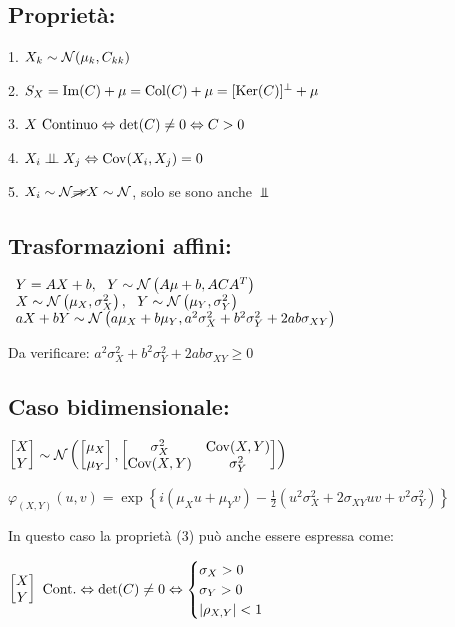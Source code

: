 \subsection{Proprietà:}

1. $X_k \sim \mathcal N( \mu_k ,C_{kk})$

2. $S_X =\operatorname{Im} (C)+\mu =\operatorname{Col} (C)+\mu =[\operatorname{Ker} (C)]^{\perp} +\mu $

3. $X\ \text{Continuo} \Leftrightarrow \operatorname{det} (C)\neq 0\Leftrightarrow C >0$

4. $X_i \perp \!\!\! \perp X_j \Leftrightarrow \operatorname{Cov}(X_i ,X_j) =0$

5. $X_i \sim \mathcal N\cancel{\Rightarrow} X\sim \mathcal N$, solo se sono anche $\Bot $
\subsection{Trasformazioni affini:}

$ \begin{array}{l}
Y=AX+b,\ \ Y\sim \mathcal N\left( A\mu +b,ACA^T\right)\\
X\sim \mathcal N\left( \mu_X ,\sigma^2_X\right) ,\ \ Y\sim \mathcal N\left( \mu_Y ,\sigma^2_Y\right)\\
aX+bY\sim \mathcal N\left( a\mu_X +b\mu_Y ,a^2 \sigma^2_X +b^2 \sigma^2_Y +2ab\sigma_{XY}\right)
\end{array}$

Da verificare: $a^2 \sigma^2_X +b^2 \sigma^2_Y +2ab\sigma_{XY} \geq 0$
\subsection{Caso bidimensionale:}

$\begin{bmatrix}
X\\
Y
\end{bmatrix} \sim \mathcal N\left(\begin{bmatrix}
\mu_X\\
\mu_Y
\end{bmatrix} ,\begin{bmatrix}
\sigma^2_X & \operatorname{Cov}(X,Y)\\
\operatorname{Cov}(X,Y) & \sigma^2_Y
\end{bmatrix}\right)$

$\varphi_{(X,Y)} (u,v)=\exp\left\{i( \mu_X u+\mu_Y v) -\frac{1}{2}\left( u^2 \sigma^2_X +2\sigma_{XY} uv+v^2 \sigma^2_Y\right)\right\}$

In questo caso la proprietà (3) può anche essere espressa come:

$\begin{bmatrix}
X\\
Y
\end{bmatrix} \ \text{Cont.} \Leftrightarrow \operatorname{det} (C)\neq 0\Leftrightarrow \begin{cases}
\sigma_X >0\\
\sigma_Y >0\\
| \rho_{X,Y}| < 1
\end{cases}$

